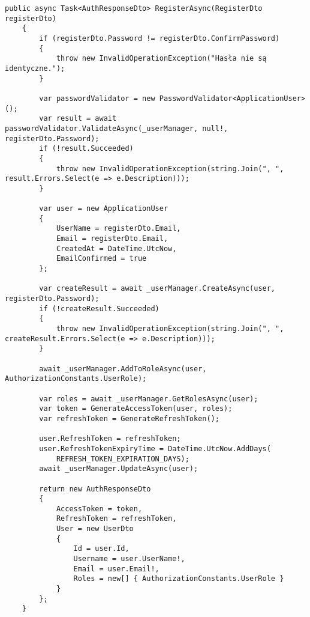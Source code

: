\begin{lstlisting}[style=csharp, caption={Implementacja rejestracji},label={lst:rejestracja}]
	public async Task<AuthResponseDto> RegisterAsync(RegisterDto registerDto)
	{
		if (registerDto.Password != registerDto.ConfirmPassword)
		{
			throw new InvalidOperationException("Hasła nie są identyczne.");
		}
		
		var passwordValidator = new PasswordValidator<ApplicationUser>();
		var result = await passwordValidator.ValidateAsync(_userManager, null!, registerDto.Password);
		if (!result.Succeeded)
		{
			throw new InvalidOperationException(string.Join(", ", result.Errors.Select(e => e.Description)));
		}
		
		var user = new ApplicationUser
		{
			UserName = registerDto.Email,
			Email = registerDto.Email,
			CreatedAt = DateTime.UtcNow,
			EmailConfirmed = true
		};
		
		var createResult = await _userManager.CreateAsync(user, registerDto.Password);
		if (!createResult.Succeeded)
		{
			throw new InvalidOperationException(string.Join(", ", createResult.Errors.Select(e => e.Description)));
		}
		
		await _userManager.AddToRoleAsync(user, AuthorizationConstants.UserRole);
		
		var roles = await _userManager.GetRolesAsync(user);
		var token = GenerateAccessToken(user, roles);
		var refreshToken = GenerateRefreshToken();
		
		user.RefreshToken = refreshToken;
		user.RefreshTokenExpiryTime = DateTime.UtcNow.AddDays(
			REFRESH_TOKEN_EXPIRATION_DAYS);
		await _userManager.UpdateAsync(user);
		
		return new AuthResponseDto
		{
			AccessToken = token,
			RefreshToken = refreshToken,
			User = new UserDto
			{
				Id = user.Id,
				Username = user.UserName!,
				Email = user.Email!,
				Roles = new[] { AuthorizationConstants.UserRole }
			}
		};
	}
\end{lstlisting}

\pagebreak

